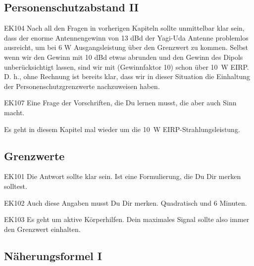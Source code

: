 \subsection{Personenschutzabstand II }

\begin{sol}{EK104}
    Nach all den Fragen in vorherigen Kapiteln sollte unmittelbar klar sein, dass der enorme Antennengewinn von 13 dBd der Yagi-Uda Antenne problemlos ausreicht, um bei 6 W Ausgangsleistung über den Grenzwert zu kommen. Selbst wenn wir den Gewinn mit 10 dBd etwas abrunden und den Gewinn des Dipols unberücksichtigt lassen, sind wir mit (Gewinnfaktor 10) schon über \SI{10}{\watt} EIRP.
    D. h., ohne Rechnung ist bereits klar, dass wir in dieser Situation die Einhaltung der Personenschutzgrenzwerte nachzuweisen haben.
\end{sol}

\begin{sol}{EK107}
Eine Frage der Vorschriften, die Du lernen musst, die aber auch Sinn macht.

\end{sol}


\begin{ohmchapter}
 Es geht in diesem Kapitel mal wieder um die \SI{10}{\watt} EIRP-Strahlungsleistung.
\end{ohmchapter}


\subsection{Grenzwerte }

\begin{sol}{EK101}
Die Antwort sollte klar sein. Ist eine Formulierung, die Du Dir merken solltest.
\end{sol}

\begin{sol}{EK102}
Auch diese Angaben musst Du Dir merken. Quadratisch und 6 Minuten.
\end{sol}

\begin{sol}{EK103}
Es geht um aktive Körperhilfen. Dein maximales Signal sollte also immer den Grenzwert einhalten.
\end{sol}



\begin{ohmchapter}
\end{ohmchapter}

\subsection{Näherungsformel I}

